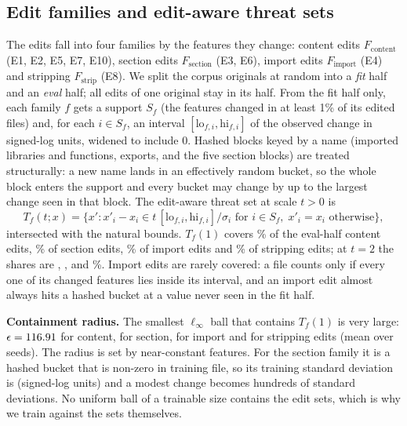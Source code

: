 \documentclass[preprint,12pt,authoryear]{elsarticle}
\begin{document}
\begin{table}[!htbp]
\centering\small
\caption{$\epsilon$ in real units for the median test malware of one seed: the largest increase in each quantity that an $\ell_\infty$ budget allows, and the $\epsilon$ that one more unit needs.}\label{tab:epsunits}
\resizebox{\textwidth}{!}{}
\end{table}

\subsection{Edit families and edit-aware threat sets}\label{sec:families}
The edits fall into four families by the features they change: content edits $F_{\text{content}}$ (E1, E2, E5, E7, E10), section edits $F_{\text{section}}$ (E3, E6), import edits $F_{\text{import}}$ (E4) and stripping $F_{\text{strip}}$ (E8). We split the corpus originals at random into a \emph{fit} half and an \emph{eval} half; all edits of one original stay in its half. From the fit half only, each family $f$ gets a support $S_f$ (the features changed in at least 1\% of its edited files) and, for each $i\in S_f$, an interval $[\mathrm{lo}_{f,i},\mathrm{hi}_{f,i}]$ of the observed change in signed-log units, widened to include 0. Hashed blocks keyed by a name (imported libraries and functions, exports, and the five section blocks) are treated structurally: a new name lands in an effectively random bucket, so the whole block enters the support and every bucket may change by up to the largest change seen in that block. The edit-aware threat set at scale $t>0$ is
\begin{equation}
T_f(t;x)=\bigl\{x' : x'_i-x_i\in t\,[\mathrm{lo}_{f,i},\mathrm{hi}_{f,i}]/\sigma_i \text{ for } i\in S_f,\; x'_i=x_i \text{ otherwise}\bigr\},
\end{equation}
intersected with the natural bounds. $T_f(1)$ covers \FamContentCovOne\% of the eval-half content edits, \FamSectionCovOne\% of section edits, \FamImportCovOne\% of import edits and \FamStripCovOne\% of stripping edits; at $t=2$ the shares are \FamContentCovTwo, \FamSectionCovTwo, \FamImportCovTwo{} and \FamStripCovTwo\%. Import edits are rarely covered: a file counts only if every one of its changed features lies inside its interval, and an import edit almost always hits a hashed bucket at a value never seen in the fit half.

\textbf{Containment radius.} The smallest $\ell_\infty$ ball that contains $T_f(1)$ is very large: $\epsilon=116.91$ for content, \SwRadiusSection{} for section, \SwRadiusImport{} for import and \SwRadiusStrip{} for stripping edits (mean over seeds). The radius is set by near-constant features. For the section family it is a hashed \texttt{\SwRadiusUnit} bucket that is non-zero in \SwRadiusUnitNTrain{} training file, so its training standard deviation is \SwRadiusSectionSd{} (signed-log units) and a modest change becomes hundreds of standard deviations. No uniform ball of a trainable size contains the edit sets, which is why we train against the sets themselves.
\end{document}
